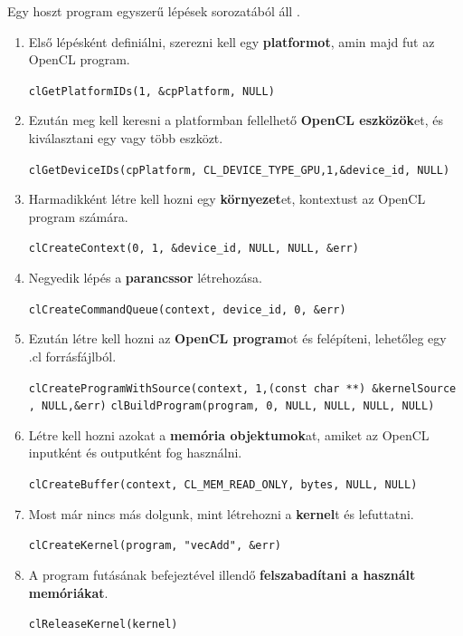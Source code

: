 Egy hoszt program egyszerű lépések sorozatából áll \cite{opencl_host}.

\begin{enumerate}
\item Első lépésként definiálni, szerezni kell egy \textbf{platformot}, amin majd fut az OpenCL program. 

\texttt{clGetPlatformIDs(1, \&cpPlatform, NULL)}
\item Ezután meg kell keresni a platformban fellelhető \textbf{OpenCL eszközök}et, és kiválasztani egy vagy több eszközt.

\texttt{clGetDeviceIDs(cpPlatform, CL\_DEVICE\_TYPE\_GPU,1,\&device\_id, NULL)}
\item Harmadikként létre kell hozni egy \textbf{környezet}et, kontextust az OpenCL program számára.

\texttt{clCreateContext(0, 1, \&device\_id, NULL, NULL, \&err)}
\item Negyedik lépés a \textbf{parancssor} létrehozása.

\texttt{clCreateCommandQueue(context, device\_id, 0, \&err)}
\item Ezután létre kell hozni az \textbf{OpenCL program}ot és felépíteni, lehetőleg egy .cl forrásfájlból.

\texttt{clCreateProgramWithSource(context, 1,(const char **) \&kernelSource\\ , NULL,\&err)}
\newline
\texttt{clBuildProgram(program, 0, NULL, NULL, NULL, NULL)}
\item Létre kell hozni azokat a \textbf{memória objektumok}at, amiket az OpenCL inputként és outputként fog használni.

\texttt{clCreateBuffer(context, CL\_MEM\_READ\_ONLY, bytes, NULL, NULL)}
\item Most már nincs más dolgunk, mint létrehozni a \textbf{kernel}t és lefuttatni.

\texttt{clCreateKernel(program, "vecAdd", \&err)}
\item A program futásának befejeztével illendő \textbf{felszabadítani a használt memóriákat}.

\texttt{clReleaseKernel(kernel)}
\end{enumerate}
	

